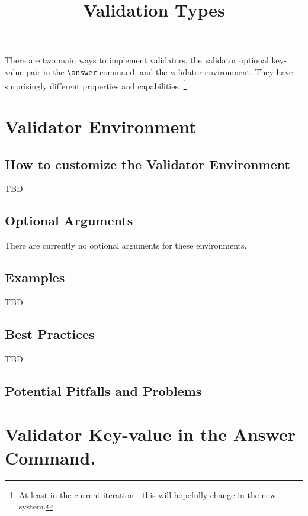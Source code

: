 \documentclass{ximera}
\title{Validation Types}
\begin{document}
\begin{abstract}
\end{abstract}
\maketitle

There are two main ways to implement validators, the validator optional key-value pair in the \verb|\answer| command, and the validator environment. They have surprisingly different properties and capabilities.%
\footnote{At least in the current iteration - this will hopefully change in the new system.}

\section*{Validator Environment}
    \subsection*{How to customize the Validator Environment}
        TBD
        
    \subsection*{Optional Arguments}
        There are currently no optional arguments for these environments.

    \subsection*{Examples}
    
        TBD
        
    \subsection*{Best Practices}
    
        TBD
        
    
    \subsection*{Potential Pitfalls and Problems}
    


\section*{Validator Key-value in the Answer Command.}
\end{document}
